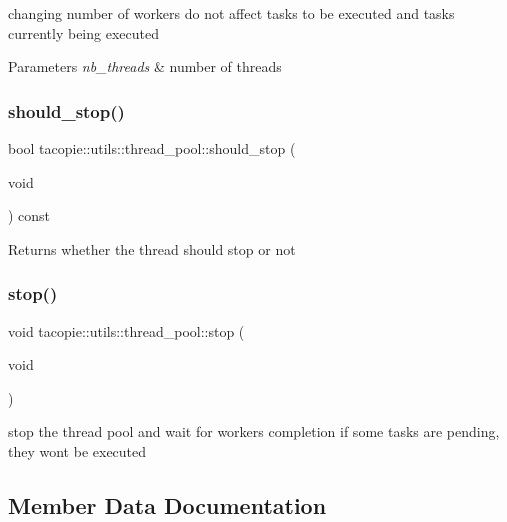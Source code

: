 changing number of workers do not affect tasks to be executed and tasks currently being executed


\begin{DoxyParams}{Parameters}
{\em nb\+\_\+threads} & number of threads \\
\hline
\end{DoxyParams}
\mbox{\label{classtacopie_1_1utils_1_1thread__pool_a7a4dbfe7877e2ce8a4189e6f3d3da3a9}} 
\subsubsection{\texorpdfstring{should\+\_\+stop()}{should\_stop()}}
{\footnotesize\ttfamily bool tacopie\+::utils\+::thread\+\_\+pool\+::should\+\_\+stop (\begin{DoxyParamCaption}\item[{void}]{ }\end{DoxyParamCaption}) const\hspace{0.3cm}{\ttfamily [private]}}

\begin{DoxyReturn}{Returns}
whether the thread should stop or not 
\end{DoxyReturn}
\mbox{\label{classtacopie_1_1utils_1_1thread__pool_a8874d7040d12fbe446519bc9f2bcff37}} 
\subsubsection{\texorpdfstring{stop()}{stop()}}
{\footnotesize\ttfamily void tacopie\+::utils\+::thread\+\_\+pool\+::stop (\begin{DoxyParamCaption}\item[{void}]{ }\end{DoxyParamCaption})}

stop the thread pool and wait for workers completion if some tasks are pending, they won\textquotesingle{}t be executed 

\subsection{Member Data Documentation}
\mbox{\label{classtacopie_1_1utils_1_1thread__pool_acb37b2e75b5b0ded2b3bc3174c7ba43f}} 
